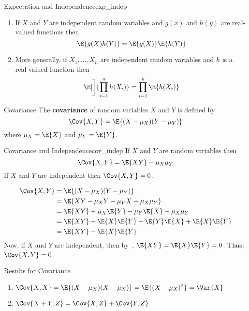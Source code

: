 \begin{Theorem}{Expectation and Independence}{exp_indep}
    \begin{enumerate}[label=(\arabic*)]
        \item If $ X $ and $ Y $ are independent
              random variables and $ g(x) $ and $ h(y) $
              are real-valued functions then
              \[ \E{g(X)h(Y)}=\E{g(X)}\E{h(Y)} \]
        \item More generally, if $ X_1,\ldots,X_n $ are independent
              random variables and $ h $
              is a real-valued function then
              \[ \E[\bigg]{\prod_{i=1}^n h(X_i)}=
                  \prod_{i=1}^n \E{h(X_i)} \]
    \end{enumerate}
\end{Theorem}
\begin{Definition}{Covariance}{}
    The \textbf{covariance} of
    random variables $ X $ and $ Y $ is defined by
    \[ \Cov{X,Y}=\E{(X-\mu_X)(Y-\mu_Y)} \]
    where $ \mu_X=\E{X} $ and $ \mu_Y=\E{Y} $.
\end{Definition}
\begin{Theorem}{Covariance and Independence}{cov_indep}
    If $ X $ and $ Y $ are random variables then
    \[ \Cov{X,Y}=\E{XY}-\mu_X\mu_Y \]
    If $ X $ and $ Y $ are independent then $ \Cov{X,Y}=0 $.
\end{Theorem}
\begin{Proof}{}{}
    \begin{align*}
        \Cov{X,Y}
         & =\E{(X-\mu_X)(Y-\mu_Y)}                  \\
         & =\E{XY-\mu_X Y - \mu_Y X + \mu_X\mu_Y}   \\
         & =\E{XY}-\mu_X\E{Y}-\mu_Y\E{X}+\mu_X\mu_Y \\
         & =\E{XY}-\E{X}\E{Y}-\E{Y}\E{X}+\E{X}\E{Y} \\
         & =\E{XY}-\E{X}\E{Y}
    \end{align*}
    Now, if $ X $ and $ Y $ are independent, then
    by~, $ \E{XY}=\E{X}\E{Y}=0 $. Thus,
    $ \Cov{X,Y}=0 $.
\end{Proof}
\begin{Theorem}{Results for Covariance}{}
    \begin{enumerate}[label=(\arabic*)]
        \item $ \Cov{X,X}=\E{(X-\mu_X)(X-\mu_X)}=\E{(X-\mu_X)^2}=\Var{X} $
        \item $ \Cov{X+Y,Z}=\Cov{X,Z}+\Cov{Y,Z} $
    \end{enumerate}
\end{Theorem}
